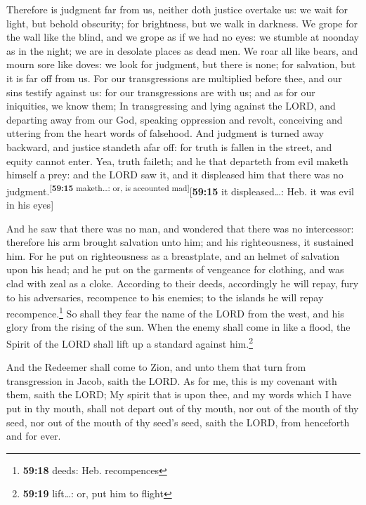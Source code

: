  Therefore is judgment far from us, neither doth justice
overtake us: we wait for light, but behold obscurity; for brightness,
but we walk in darkness.  We grope for the wall like the
blind, and we grope as if we had no eyes: we stumble at noonday as in
the night; we are in desolate places as dead men.  We
roar all like bears, and mourn sore like doves: we look for judgment,
but there is none; for salvation, but it is far off from us.
 For our transgressions are multiplied before thee, and
our sins testify against us: for our transgressions are with us; and as
for our iniquities, we know them;  In transgressing and
lying against the LORD, and departing away from our God, speaking
oppression and revolt, conceiving and uttering from the heart words of
falsehood.  And judgment is turned away backward, and
justice standeth afar off: for truth is fallen in the street, and equity
cannot enter.  Yea, truth faileth; and he that departeth
from evil maketh himself a prey: and the LORD saw it, and it displeased
him that there was no judgment.\textsuperscript{{[}\textbf{59:15}
maketh\ldots: or, is accounted mad{]}}{[}\textbf{59:15} it
displeased\ldots: Heb. it was evil in his eyes{]}

 And he saw that there was no man, and wondered that
there was no intercessor: therefore his arm brought salvation unto him;
and his righteousness, it sustained him.  For he put on
righteousness as a breastplate, and an helmet of salvation upon his
head; and he put on the garments of vengeance for clothing, and was clad
with zeal as a cloke.  According to their deeds,
accordingly he will repay, fury to his adversaries, recompence to his
enemies; to the islands he will repay recompence.\footnote{\textbf{59:18}
  deeds: Heb. recompences}  So shall they fear the name
of the LORD from the west, and his glory from the rising of the sun.
When the enemy shall come in like a flood, the Spirit of the LORD shall
lift up a standard against him.\footnote{\textbf{59:19} lift\ldots: or,
  put him to flight}

 And the Redeemer shall come to Zion, and unto them that
turn from transgression in Jacob, saith the LORD.  As for
me, this is my covenant with them, saith the LORD; My spirit that is
upon thee, and my words which I have put in thy mouth, shall not depart
out of thy mouth, nor out of the mouth of thy seed, nor out of the mouth
of thy seed's seed, saith the LORD, from henceforth and for ever.

